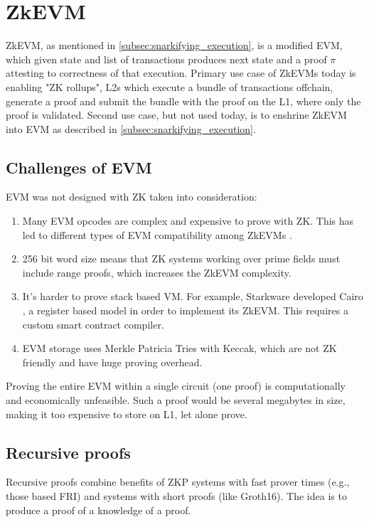 \section{ZkEVM}

ZkEVM, as mentioned in \ref{subsec:snarkifying_execution}, is a modified EVM,
which given state and list of transactions produces next state and a proof $\pi$
attesting to correctness of that execution. Primary use case of ZkEVMs today is
enabling "ZK rollups", L2s which execute a bundle of transactions offchain,
generate a proof and submit the bundle with the proof on the L1, where only the
proof is validated. Second use case, but not used today, is to enshrine ZkEVM
into EVM as described in \ref{subsec:snarkifying_execution}.

\subsection{Challenges of EVM}

EVM was not designed with ZK taken into consideration:

\begin{enumerate}
	\item Many EVM opcodes are complex and expensive to prove with ZK. This has
		led to different types of EVM compatibility among ZkEVMs \cite{VitalikButerinZkEVMTypes}.
	\item 256 bit word size means that ZK systems working over prime fields must
		include range proofs, which increases the ZkEVM complexity.
	\item It's harder to prove stack based VM. For example, Starkware developed
		Cairo \cite{Cairo}, a register based model in order to implement its ZkEVM.
		This requires a custom smart contract compiler.
	\item EVM storage uses Merkle Patricia Tries with Keccak, which are not
		ZK friendly and have huge proving overhead.
\end{enumerate}

Proving the entire EVM within a single circuit (one proof) is computationally
and economically unfeasible. Such a proof would be several megabytes in size,
making it too expensive to store on L1, let alone prove.

\subsection{Recursive proofs}

Recursive proofs combine benefits of ZKP systems with fast prover times (e.g.,
those based FRI) and systems with short proofs (like Groth16). The idea is to
produce a proof of a knowledge of a proof.

